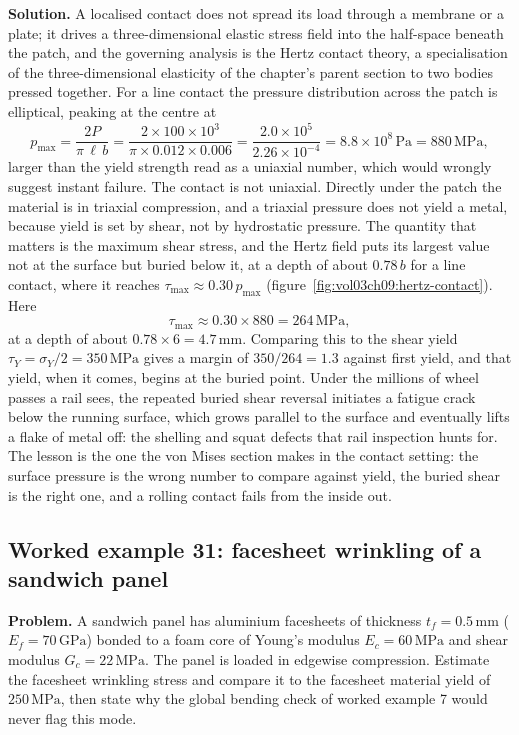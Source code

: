 \textbf{Solution.} A localised contact does not spread its load through a
membrane or a plate; it drives a three-dimensional elastic stress field
into the half-space beneath the patch, and the governing analysis is the
Hertz contact theory, a specialisation of the three-dimensional elasticity
of the chapter's parent section to two bodies pressed together. For a line
contact the pressure distribution across the patch is elliptical, peaking at
the centre at
\[
p_{\max} = \frac{2 P}{\pi\,\ell\,b}
= \frac{2\times 100\times 10^3}{\pi\times 0.012\times 0.006}
= \frac{2.0\times 10^5}{2.26\times 10^{-4}}
= 8.8\times 10^{8}\,\text{Pa} = 880\,\text{MPa},
\]
larger than the yield strength read as a uniaxial number, which would wrongly
suggest instant failure. The contact is not uniaxial. Directly under the
patch the material is in triaxial compression, and a triaxial pressure does
not yield a metal, because yield is set by shear, not by hydrostatic
pressure. The quantity that matters is the maximum shear stress, and the
Hertz field puts its largest value not at the surface but buried below it, at
a depth of about $0.78\,b$ for a line contact, where it reaches
$\tau_{\max}\approx 0.30\,p_{\max}$
(figure~\ref{fig:vol03ch09:hertz-contact}). Here
\[
\tau_{\max} \approx 0.30\times 880 = 264\,\text{MPa},
\]
at a depth of about $0.78\times 6 = 4.7\,\si{\milli\meter}$. Comparing this
to the shear yield $\tau_Y = \sigma_Y/2 = 350\,\text{MPa}$ gives a margin of
$350/264 = 1.3$ against first yield, and that yield, when it comes, begins at
the buried point. Under the millions of wheel passes a rail sees, the
repeated buried shear reversal initiates a fatigue crack below the running
surface, which grows parallel to the surface and eventually lifts a flake of
metal off: the shelling and squat defects that rail inspection hunts for. The
lesson is the one the von Mises section makes in the contact setting: the
surface pressure is the wrong number to compare against yield, the buried
shear is the right one, and a rolling contact fails from the inside out.

\subsection*{Worked example 31: facesheet wrinkling of a sandwich panel}

\textbf{Problem.} A sandwich panel has aluminium facesheets of thickness
$t_f = 0.5\,\si{\milli\meter}$ ($E_f = 70\,\text{GPa}$) bonded to a foam core
of Young's modulus $E_c = 60\,\text{MPa}$ and shear modulus $G_c = 22\,
\text{MPa}$. The panel is loaded in edgewise compression. Estimate the
facesheet wrinkling stress and compare it to the facesheet material yield of
$250\,\text{MPa}$, then state why the global bending check of worked example
7 would never flag this mode.

